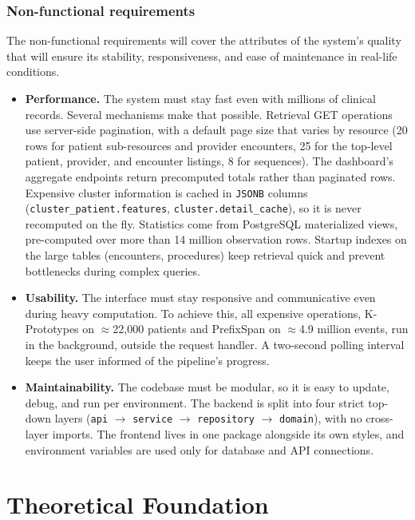 \subsubsection*{Non-functional requirements}

The non-functional requirements will cover the attributes of the system’s quality that will ensure its stability, responsiveness, and ease of maintenance in real-life conditions.

\begin{itemize}
    \item \textbf{Performance.} The system must stay fast even with millions of clinical records. Several mechanisms make that possible. Retrieval GET operations use server-side pagination, with a default page size that varies by resource (20 rows for patient sub-resources and provider encounters, 25 for the top-level patient, provider, and encounter listings, 8 for sequences). The dashboard's aggregate endpoints return precomputed totals rather than paginated rows. Expensive cluster information is cached in \texttt{JSONB} columns (\texttt{cluster\_patient.features}, \texttt{cluster.detail\_cache}), so it is never recomputed on the fly. Statistics come from PostgreSQL materialized views, pre-computed over more than 14 million observation rows. Startup indexes on the large tables (encounters, procedures) keep retrieval quick and prevent bottlenecks during complex queries.
    \item \textbf{Usability.} The interface must stay responsive and communicative even during heavy computation. To achieve this, all expensive operations, K-Prototypes on $\approx$22{,}000 patients and PrefixSpan on $\approx$4.9 million events, run in the background, outside the request handler. A two-second polling interval keeps the user informed of the pipeline's progress.
    \item \textbf{Maintainability.} The codebase must be modular, so it is easy to update, debug, and run per environment. The backend is split into four strict top-down layers (\texttt{api} $\rightarrow$ \texttt{service} $\rightarrow$ \texttt{repository} $\rightarrow$ \texttt{domain}), with no cross-layer imports. The frontend lives in one package alongside its own styles, and environment variables are used only for database and API connections.
\end{itemize}

\section{Theoretical Foundation}

